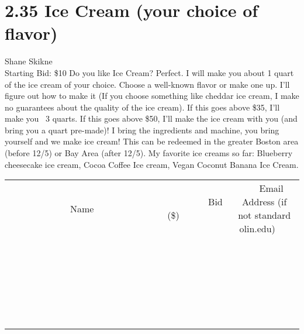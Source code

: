 \documentclass[11pt]{article}
\begin{document}
\section*{2.35 Ice Cream (your choice of flavor)}
Shane Skikne
\\
Starting Bid: \$10
\newline
Do you like Ice Cream? Perfect. I will make you about 1 quart of the ice cream of your choice. Choose a well-known flavor or make one up. I'll figure out how to make it (If you choose something like cheddar ice cream, I make no guarantees about the quality of the ice cream). If this goes above \$35, I'll make you ~3 quarts. If this goes above \$50, I'll make the ice cream with you (and bring you a quart pre-made)! I bring the ingredients and machine, you bring yourself and we make ice cream! This can be redeemed in the greater Boston area (before 12/5) or Bay Area (after 12/5). My favorite ice creams so far: Blueberry cheesecake ice cream, Cocoa Coffee Ice cream, Vegan Coconut Banana Ice Cream.
\\[6ex]
\begin{tabular}{c c c}
~~~~~~~~~~~~~Name~~~~~~~~~~~~~ & ~~~~~~~~~Bid (\$)~~~~~~~~~  & ~~~Email Address (if not standard olin.edu)~~~\\
 & & \\
\hline
 & & \\
\hline
 & & \\
\hline
 & & \\
\hline
 & & \\
\hline
 & & \\
\hline
 & & \\
\hline
 & & \\
\hline
 & & \\
\hline
 & & \\
\hline
 & & \\
\hline
 & & \\
\hline
 & & \\
\hline
 & & \\
\hline
 & & \\
\hline
 & & \\
\hline
 & & \\
\hline
 & & \\
\hline
 & & \\
\hline
 & & \\
\hline
 & & \\
\hline
 & & \\
\hline
 & & \\
\hline
 & & \\
\hline
 & & \\
\hline
 & & \\
\hline
\end{tabular}
\newpage
\end{document}
